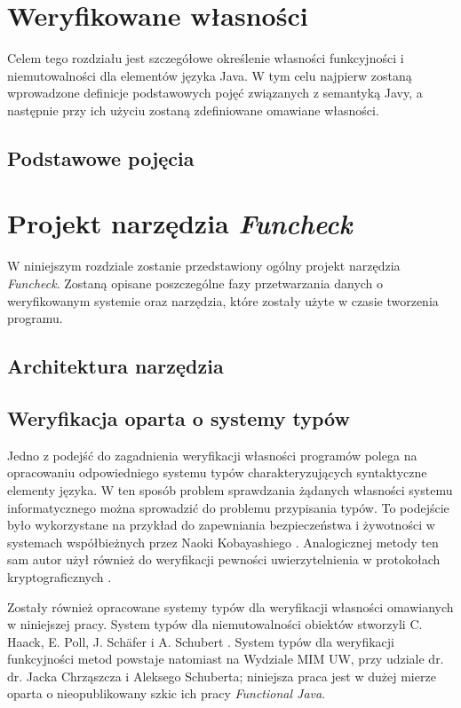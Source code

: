 \documentclass{pracamgr}
\begin{document}
\chapter{Weryfikowane własności}
\label{purity}

Celem tego rozdziału jest szczegółowe określenie własności
funkcyjności i niemutowalności dla elementów języka Java. W tym celu
najpierw zostaną wprowadzone definicje podstawowych pojęć związanych z
semantyką Javy, a następnie przy ich użyciu zostaną zdefiniowane 
omawiane własności. 

\section{Podstawowe pojęcia}

\chapter{Projekt narzędzia \emph{Funcheck}}
\label{project}

W niniejszym rozdziale zostanie przedstawiony ogólny projekt narzędzia
\emph{Funcheck}. Zostaną opisane poszczególne fazy przetwarzania
danych o weryfikowanym systemie oraz narzędzia, które zostały użyte w 
czasie tworzenia programu. 

\section{Architektura narzędzia}



\section{Weryfikacja oparta o systemy typów}

Jedno z podejść do zagadnienia weryfikacji własności programów polega
na opracowaniu odpowiedniego systemu typów charakteryzujących
syntaktyczne elementy języka. W ten sposób problem sprawdzania
żądanych własności systemu informatycznego można sprowadzić do
problemu przypisania typów. To podejście było wykorzystane na przykład
do zapewniania bezpieczeństwa i żywotności w systemach współbieżnych
przez Naoki Kobayashiego \cite{tb-concurrent}. Analogicznej metody ten
sam autor użył również do weryfikacji pewności uwierzytelnienia w
protokołach kryptograficznych \cite{tb-cryptographic}.

Zostały również opracowane systemy typów dla weryfikacji własności
omawianych w niniejszej pracy. System typów dla niemutowalności
obiektów stworzyli C. Haack, E. Poll, J. Schäfer i A. Schubert
\cite{immutability}. System typów dla weryfikacji funkcyjności metod
powstaje natomiast na Wydziale MIM UW, przy udziale dr. dr. Jacka
Chrząszcza i Aleksego Schuberta; niniejsza praca jest w dużej mierze
oparta o nieopublikowany szkic ich pracy \emph{Functional Java}.
\end{document}
